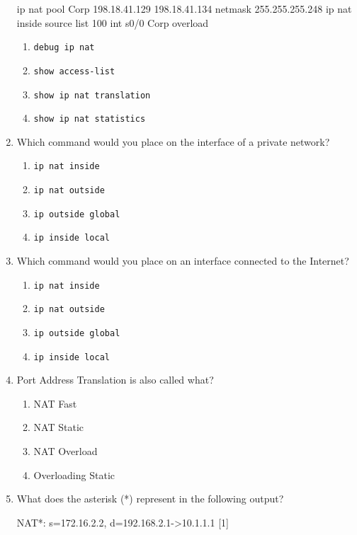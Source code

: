 \begin{enumerate}
\begin{cli}
ip nat pool Corp 198.18.41.129 198.18.41.134 netmask 255.255.255.248
ip nat inside source list 100 int s0/0 Corp overload
\end{cli}

  \begin{enumerate}
    \item
    \texttt{debug\ ip\ nat}
  \item
    \texttt{show\ access-list}
  \item
    \texttt{show\ ip\ nat\ translation}
  \item
    \texttt{show\ ip\ nat\ statistics}
  \end{enumerate}
\item
  Which command would
  you place on the interface of a private network?

  \begin{enumerate}
    \item
    \texttt{ip\ nat\ inside}
  \item
    \texttt{ip\ nat\ outside}
  \item
    \texttt{ip\ outside\ global}
  \item
    \texttt{ip\ inside\ local}
  \end{enumerate}
\item
  Which command would you place on an interface connected to the
  Internet?

  \begin{enumerate}
    \item
    \texttt{ip\ nat\ inside}
  \item
    \texttt{ip\ nat\ outside}
  \item
    \texttt{ip\ outside\ global}
  \item
    \texttt{ip\ inside\ local}
  \end{enumerate}
\item
  Port Address Translation is also called what?

  \begin{enumerate}
    \item
    NAT Fast
  \item
    NAT Static
  \item
    NAT Overload
  \item
    Overloading Static
  \end{enumerate}
\item
  What does the asterisk (*) represent in the following output?

\begin{cli}
NAT*: s=172.16.2.2, d=192.168.2.1->10.1.1.1 [1]
\end{cli}


\end{enumerate}
